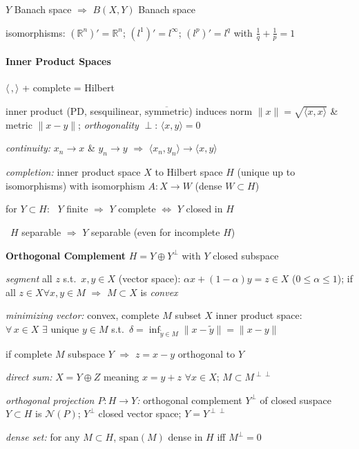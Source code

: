 \documentclass[8pt,twoside]{extarticle}
\begin{document}
\begin{multicols}{2}
$Y$ Banach space $\Rightarrow$ $B(X,Y)$ Banach space

isomorphisms: $(\mathbb{R}^n)'{=}\mathbb{R}^n$; $(l^1)'{=}l^\infty$; $(l^p)'{=}l^q$ with $\frac{1}{q}{+}\frac{1}{p}{=}1$

\paragraph{Inner Product Spaces} $\langle\,,\rangle$ + complete = Hilbert

inner product (PD, sesquilinear, $\overline{\text{symmetric}}$) induces norm $\|x\|=\sqrt{\langle x,x\rangle}$ \& metric $\|x-y\|$;
\textit{orthogonality} $\perp$: $\langle x,y\rangle=0$

\textit{continuity:} $x_n\to x$ \& $y_n\to y \,\,\Rightarrow\,\, \langle x_n,y_n\rangle\to\langle x,y\rangle$

\textit{completion:} inner product space $X$ to Hilbert space $H$ (unique up to isomorphisms) with isomorphism $A: X\to W$ (dense $W{\subset} H$)

for $Y{\subset} H$: \textbullet\ $Y$ finite $\Rightarrow$ $Y$ complete  $\Leftrightarrow$ $Y$ closed in $H$

\hspace{4.72em}\textbullet\ $H$ separable $\Rightarrow$ $Y$ separable (even for incomplete $H$)

\textbf{Orthogonal Complement} $H{=}Y{\oplus} Y^\perp$ with $Y$ closed subspace

\textit{segment} all $z$ s.t.\ $x,y\in X$ (vector space): $\alpha x{+}(1{-}\alpha)y=z{\in} X$ ($0{\leq}\alpha{\leq}1$); if all $z\in X \forall x,y\in M$ $\Rightarrow$ $M{\subset} X$ is \textit{convex}

\textit{minimizing vector:} convex, complete $M$ subset $X$ inner product space: $\forall \,x{\in} X \,\,\exists \text{ unique }y{\in} M$ s.t.\ $\delta=\inf
_{\tilde{y}\in M}\|x-\tilde{y}\|=\|x-y\|$

if complete $M$ subspace $Y$ $\Rightarrow$ $z{=}x{-}y$ orthogonal to $Y$

\textit{direct sum:} $X{=}Y{\oplus} Z$ meaning $x{=}y{+}z$ $\forall x\in X$; $M{\subset} M^{\perp\perp}$
 
 
\textit{orthogonal projection $P:H\to Y$:} orthogonal complement $Y^\perp$ of closed suspace $Y{\subset} H$ is $\mathscr{N}(P)$; $Y^\perp$ closed vector space; $Y{=} Y^{\perp\perp}$

\textit{dense set:} for any $M\subset H$, $\text{span}(M)$ dense in $H$ iff $M^\perp={0}$





\end{multicols}
\end{document}
